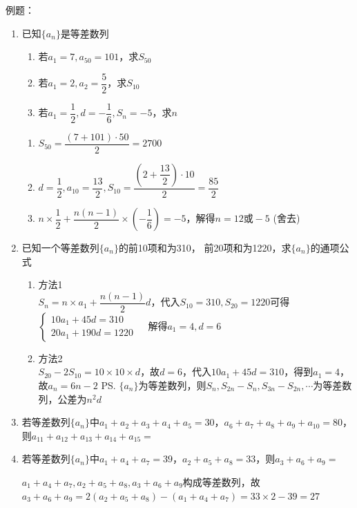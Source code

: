 例题：
\begin{enumerate}
    \item 已知$\{a_n\}$是等差数列
    \begin{enumerate}
        \item 若$a_1 = 7, a_{50} = 101$，求$S_{50}$
        \item 若$a_1 = 2, a_2 = \dfrac{5}{2}$，求$S_{10}$
        \item 若$a_1 = \dfrac{1}{2}, d = -\dfrac{1}{6}, S_n = -5$，求$n$
    \end{enumerate}
    \begin{jieda}
        \begin{enumerate}
            \item $S_{50} = \dfrac{(7 + 101) \cdot 50}{2} = 2700$
            \item $d = \dfrac{1}{2}, a_{10} = \dfrac{13}{2}, S_{10} = \dfrac{(2+\dfrac{13}{2}) \cdot 10}{2} = \dfrac{85}{2}$
            \item $n \times \dfrac{1}{2} + \dfrac{n(n-1)}{2} \times (-\dfrac{1}{6}) = -5$，解得$n = 12 \mbox{或} -5$ (舍去)
        \end{enumerate}
    \end{jieda}
    \item 已知一个等差数列$\{a_n\}$的前10项和为310， 前20项和为1220，求$\{a_n\}$的通项公式
    \begin{jieda}
        \begin{enumerate}
        \item 方法1 \\
            $S_n = n \times a_1 + \dfrac{n(n-1)}{2}d$，代入$S_{10} = 310, S_{20} = 1220$可得$\left \{ \begin{array}{ll}
            10a_1+45d = 310 &  \\
            20a_1+190d = 1220 & 
            \end{array}\right.$
            解得$a_1 = 4, d = 6$
            \item 方法2 \\
            $S_{20} - 2S_{10} = 10 \times 10 \times d$，故$d = 6$，代入$10a_1+45d = 310$，得到$a_1 = 4$，故$a_n = 6n-2$
            \ps $\{a_n\}$为等差数列，则$S_n, S_{2n}-S_n, S_{3n} - S_{2n}, \cdots$为等差数列，公差为$n^2d$
        \end{enumerate}
    \end{jieda}

    \item 若等差数列$\{a_n\}$中$a_1 + a_2 + a_3 + a_4 + a_5 = 30$，$a_6 + a_7 + a_8 + a_9 + a_{10} = 80$，则$a_{11} + a_{12} + a_{13} + a_{14} + a_{15} = $
    \item 若等差数列$\{a_n\}$中$a_1 + a_4 + a_7 = 39$，$a_2 + a_5 + a_8 = 33$，则$a_3 + a_6 + a_9 = $
    \begin{jieda}
        $a_1 + a_4 + a_7, a_2 + a_5 + a_8, a_3 + a_6 + a_9$构成等差数列，故$a_3 + a_6 + a_9 = 2(a_2 + a_5 + a_8) - (a_1 + a_4 + a_7) = 33 \times 2 - 39 = 27$
    \end{jieda}
    

\end{enumerate}
